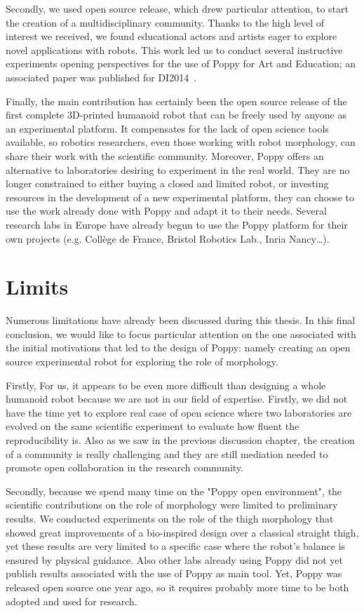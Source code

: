 Secondly, we used open source release, which drew particular attention, to start the creation of a multidisciplinary community. Thanks to the high level of interest we received, we found educational actors and artists eager to explore novel applications with robots. This work led us to conduct several instructive experiments opening perspectives for the use of Poppy for Art and Education; an associated paper was published for DI2014~\parencite{lapeyreDI}.

Finally, the main contribution has certainly been the open source release of the first complete 3D-printed humanoid robot that can be freely used by anyone as an experimental platform. It compensates for the lack of open science tools available, so robotics researchers, even those working with robot morphology, can share their work with the scientific community. Moreover, Poppy offers an alternative to laboratories desiring to experiment in the real world. They are no longer constrained to either buying a closed and limited robot, or investing resources in the development of a new experimental platform, they can choose to use the work already done with Poppy and adapt it to their needs.
Several research labs in Europe have already begun to use the Poppy platform for their own projects (e.g. Collège de France, Bristol Robotics Lab., Inria Nancy…).


\section{Limits} %

Numerous limitations have already been discussed during this thesis. In this final conclusion, we would like to focus particular attention on the one associated with the initial motivations that led to the design of Poppy: namely creating an open source experimental robot for exploring the role of morphology.

Firstly,  For us, it appears to be even more difficult than designing a whole humanoid robot because we are not in our field of expertise.
Firstly, we did not have the time yet to explore real case of open science where two laboratories are evolved on the same scientific experiment to evaluate how fluent the reproducibility is. Also as we saw in the previous discussion chapter, the creation of a community is really challenging and they are still mediation needed to promote open collaboration in the research community.

Secondly, because we spend many time on the "Poppy open environment", the scientific contributions on the role of morphology were limited to preliminary results. We conducted experiments on the role of the thigh morphology that showed great improvements of a bio-inspired design over a classical straight thigh, yet these results are very limited to a specific case where the robot’s balance is ensured by physical guidance. Also other labs already using Poppy did not yet publish results associated with the use of Poppy as main tool. Yet, Poppy was released open source one year ago, so it requires probably more time to be both adopted and used for research.


